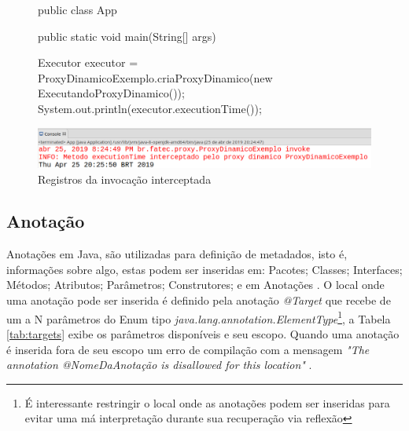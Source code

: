 \begin{figure}[H]
    \centering
    \begin{java}
public class App {
	public static void main(String[] args) {
	
		Executor executor = ProxyDinamicoExemplo.criaProxyDinamico(new ExecutandoProxyDinamico());
		System.out.println(executor.executionTime());
	}
}
    \end{java}
    \includegraphics[scale=0.4]{src/imagens/cap2/invoke-registrando-log.png}
    \caption{Registros da invocação interceptada}
    \label{fig:invoke-registrando-log}
\end{figure}

\subsection{Anotação}

\par Anotações em Java, são utilizadas para definição de metadados, isto é, informações sobre algo, estas podem ser inseridas em: Pacotes; Classes; Interfaces; Métodos; Atributos; Parâmetros; Construtores; e em Anotações . O local onde uma anotação pode ser inserida é definido pela anotação \textit{@Target} que recebe de um a N parâmetros do Enum tipo \textit{java.lang.annotation.ElementType}\footnote{É interessante restringir o local onde as anotações podem ser inseridas para evitar uma má interpretação durante sua recuperação via reflexão}, a Tabela \ref{tab:targets} exibe os parâmetros disponíveis e seu escopo. Quando uma anotação é inserida fora de seu escopo um erro de compilação com a mensagem \textit{"The annotation @NomeDaAnotação is disallowed for this location"} .

